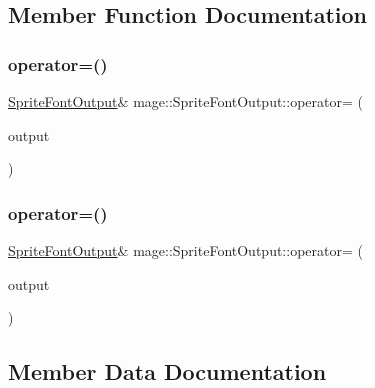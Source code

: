 \subsection{Member Function Documentation}
\hypertarget{structmage_1_1_sprite_font_output_a1eeb719ec5e2e8f84f51fc9c5db228f7}{}\label{structmage_1_1_sprite_font_output_a1eeb719ec5e2e8f84f51fc9c5db228f7} 
\subsubsection{\texorpdfstring{operator=()}{operator=()}\hspace{0.1cm}{\footnotesize\ttfamily [1/2]}}
{\footnotesize\ttfamily \hyperlink{structmage_1_1_sprite_font_output}{Sprite\+Font\+Output}\& mage\+::\+Sprite\+Font\+Output\+::operator= (\begin{DoxyParamCaption}\item[{const \hyperlink{structmage_1_1_sprite_font_output}{Sprite\+Font\+Output} \&}]{output }\end{DoxyParamCaption})\hspace{0.3cm}{\ttfamily [delete]}}

\hypertarget{structmage_1_1_sprite_font_output_a5433b918576d7e6724ed46046724a753}{}\label{structmage_1_1_sprite_font_output_a5433b918576d7e6724ed46046724a753} 
\subsubsection{\texorpdfstring{operator=()}{operator=()}\hspace{0.1cm}{\footnotesize\ttfamily [2/2]}}
{\footnotesize\ttfamily \hyperlink{structmage_1_1_sprite_font_output}{Sprite\+Font\+Output}\& mage\+::\+Sprite\+Font\+Output\+::operator= (\begin{DoxyParamCaption}\item[{\hyperlink{structmage_1_1_sprite_font_output}{Sprite\+Font\+Output} \&\&}]{output }\end{DoxyParamCaption})\hspace{0.3cm}{\ttfamily [delete]}}



\subsection{Member Data Documentation}
\hypertarget{structmage_1_1_sprite_font_output_a137cca7a8a91c623272b345e9931ca80}{}\label{structmage_1_1_sprite_font_output_a137cca7a8a91c623272b345e9931ca80} 

